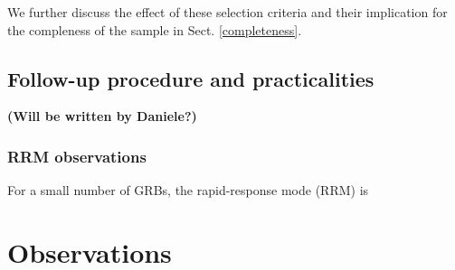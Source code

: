 \documentclass{aa}    %
\newcommand\todo[1]{\textbf{(#1)}}
\begin{document}
We further discuss the effect of these selection criteria and their implication
for the compleness of the sample in Sect. \ref{completeness}.

\subsection{Follow-up procedure and practicalities}

\todo{Will be written by Daniele?}



\subsubsection{RRM observations} \label{RRM}

For a small number of GRBs, the rapid-response mode (RRM) is 


\section{Observations} \label{obs}
\end{document}
